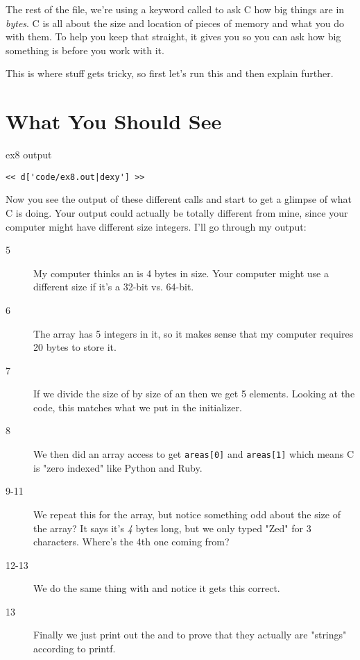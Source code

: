 The rest of the file, we're using a keyword called  to
ask C how big things are in \emph{bytes}.  C is all about the size
and location of pieces of memory and what you do with them.  To help
you keep that straight, it gives you  so you can ask
how big something is before you work with it.

This is where stuff gets tricky, so first let's run this and then
explain further.

\section{What You Should See}

\begin{code}{ex8 output}
\begin{lstlisting}
<< d['code/ex8.out|dexy'] >>
\end{lstlisting}
\end{code}

Now you see the output of these different  calls
and start to get a glimpse of what C is doing.  Your output could
actually be totally different from mine, since your computer might
have different size integers.  I'll go through my output:

\begin{description}
\item [5] My computer thinks an  is 4 bytes in size. Your computer
    might use a different size if it's a 32-bit vs. 64-bit.
\item [6] The  array has 5 integers in it, so it makes
    sense that my computer requires 20 bytes to store it.
\item [7] If we divide the size of  by size of an 
    then we get 5 elements.  Looking at the code, this matches what 
    we put in the initializer.
\item [8] We then did an array access to get \verb|areas[0]| and 
    \verb|areas[1]| which means C is "zero indexed" like Python
    and Ruby.
\item [9-11] We repeat this for the  array, but notice
    something odd about the size of the array?  It says it's 
    \emph{4} bytes long, but we only typed "Zed" for 3 characters.
    Where's the 4th one coming from?
\item [12-13] We do the same thing with  and 
    notice it gets this correct.
\item [13] Finally we just print out the  and 
    to prove that they actually are "strings" according to printf.
\end{description}

